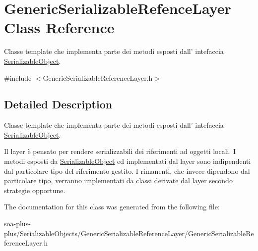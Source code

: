 \hypertarget{class_generic_serializable_refence_layer}{
\section{GenericSerializableRefenceLayer Class Reference}
\label{class_generic_serializable_refence_layer}
}


Classe template che implementa parte dei metodi esposti dall' intefaccia \hyperlink{class_serializable_object}{SerializableObject}.  




{\ttfamily \#include $<$GenericSerializableReferenceLayer.h$>$}



\subsection{Detailed Description}
Classe template che implementa parte dei metodi esposti dall' intefaccia \hyperlink{class_serializable_object}{SerializableObject}. 

Il layer è pensato per rendere serializzabili dei riferimenti ad oggetti locali. I metodi esposti da \hyperlink{class_serializable_object}{SerializableObject} ed implementati dal layer sono indipendenti dal particolare tipo del riferimento gestito. I rimanenti, che invece dipendono dal particolare tipo, verranno implementati da classi derivate dal layer secondo strategie opportune. 

The documentation for this class was generated from the following file:\begin{DoxyCompactItemize}
\item 
soa-\/plus-\/plus/SerializableObjects/GenericSerializableReferenceLayer/GenericSerializableReferenceLayer.h\end{DoxyCompactItemize}
